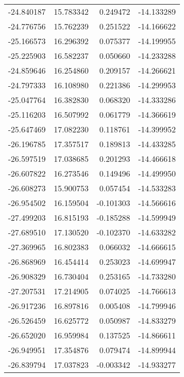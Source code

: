 \begin{tabular}{rrrr}
      -24.840187 &        15.783342 &    0.249472 & -14.133289 \\
      -24.776756 &        15.762239 &    0.251522 & -14.166622 \\
      -25.166573 &        16.296392 &    0.075377 & -14.199955 \\
      -25.225903 &        16.582237 &    0.050660 & -14.233288 \\
      -24.859646 &        16.254860 &    0.209157 & -14.266621 \\
      -24.797333 &        16.108980 &    0.221386 & -14.299953 \\
      -25.047764 &        16.382830 &    0.068320 & -14.333286 \\
      -25.116203 &        16.507992 &    0.061779 & -14.366619 \\
      -25.647469 &        17.082230 &    0.118761 & -14.399952 \\
      -26.196785 &        17.357517 &    0.189813 & -14.433285 \\
      -26.597519 &        17.038685 &    0.201293 & -14.466618 \\
      -26.607822 &        16.273546 &    0.149496 & -14.499950 \\
      -26.608273 &        15.900753 &    0.057454 & -14.533283 \\
      -26.954502 &        16.159504 &   -0.101303 & -14.566616 \\
      -27.499203 &        16.815193 &   -0.185288 & -14.599949 \\
      -27.689510 &        17.130520 &   -0.102370 & -14.633282 \\
      -27.369965 &        16.802383 &    0.066032 & -14.666615 \\
      -26.868969 &        16.454414 &    0.253023 & -14.699947 \\
      -26.908329 &        16.730404 &    0.253165 & -14.733280 \\
      -27.207531 &        17.214905 &    0.074025 & -14.766613 \\
      -26.917236 &        16.897816 &    0.005408 & -14.799946 \\
      -26.526459 &        16.625772 &    0.050987 & -14.833279 \\
      -26.652020 &        16.959984 &    0.137525 & -14.866611 \\
      -26.949951 &        17.354876 &    0.079474 & -14.899944 \\
      -26.839794 &        17.037823 &   -0.003342 & -14.933277 \\

\end{tabular}
